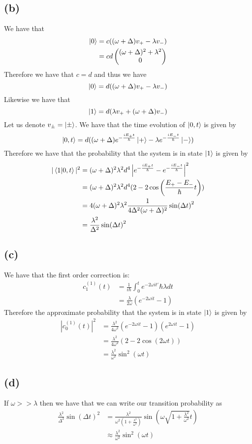\documentclass[11pt]{article}
\begin{document}
\subsection*{(b)}
We have that 
\begin{align*}
    \ket{0} &= c((\omega+\Delta)v_{+}-\lambda v_{-})\\
    &= cd \begin{pmatrix}
        (\omega+\Delta)^2+\lambda^2\\
        0
    \end{pmatrix}
\end{align*}
Therefore we have that $c=d$ and thus we have 
$$\ket{0} = d((\omega+\Delta)v_{+}-\lambda v_{-})$$
Likewise we have that 
$$\ket{1} = d(\lambda v_{+}+(\omega+\Delta)v_{-})$$
Let us denote $v_{\pm} = \ket{\pm}$. We have that the time evolution of 
$\ket{0,t}$ is given by
$$\ket{0,t} = d((\omega+\Delta)e^{-\frac{iE_{+}t}{\hbar}}\ket{+}-
\lambda e^{-\frac{iE_{-}t}{\hbar}}\ket{-})$$
Therefore we have that the probability that the 
system is in state $\ket{1}$ is given by 
\begin{align*}
    |\bra{1}\ket{0,t}|^2 &= (\omega+\Delta)^2\lambda^2 d^4\left| e^{-\frac{iE_{+}t}{\hbar}}
    -e^{-\frac{iE_{-}t}{\hbar}}\right|^2\\
    &= (\omega+\Delta)^2\lambda^2 d^4 (2-2\cos\left(\frac{E_{+}-E_{-}}{\hbar}t\right))\\
    &= 4 (\omega+\Delta)^2\lambda^2 \frac{1}{4\Delta^2(\omega+\Delta)^2} \sin(\Delta t)^2\\
    &= \frac{\lambda^2}{\Delta^2}\sin(\Delta t)^2
\end{align*}
\subsection*{(c)}
We have that the first order correction is:
\begin{align*}
    c_{1}^{(1)}(t) &= \frac{1}{i\hbar}\int_{0}^{t} e^{-2\omega i t'} \hbar\lambda dt\\
    &= \frac{\lambda}{2\omega}\left(e^{-2\omega i t}-1\right)
\end{align*}
Therefore the approximate probability that the system is in state $\ket{1}$ is given by
\begin{align*}
    |c_{0}^{(1)}(t)|^2 &= \frac{\lambda^2}{4\omega^2}\left(e^{-2\omega i t}-1\right)\left(e^{2\omega i t}-1\right)\\
    &= \frac{\lambda^2}{4\omega^2}\left(2-2\cos(2\omega t)\right)\\
    &= \frac{\lambda^2}{\omega^2}\sin^2(\omega t)
\end{align*}
\subsection*{(d)}
If $\omega>>\lambda$ then we have that we can write our transition probability
as 
\begin{align*}
    \frac{\lambda^2}{\Delta^2}\sin(\Delta t)^2 &= \frac{\lambda^2}{\omega^2\left(1+\frac{\lambda^2}{\omega^2}\right)}\sin\left(\omega\sqrt{1+\frac{\lambda^2}{\omega^2}}t\right)\\
    &\approx \frac{\lambda^2}{\omega^2}\sin^2(\omega t)
\end{align*}
\end{document}
